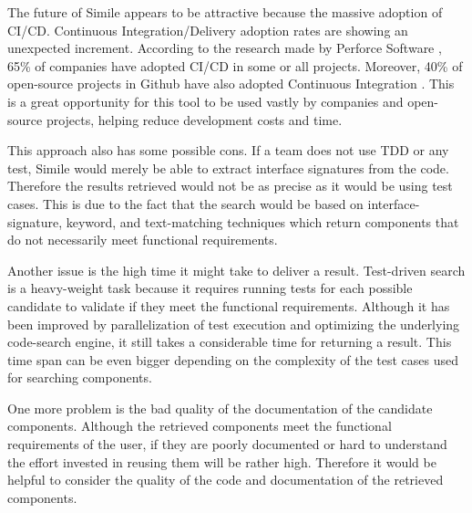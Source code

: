 The future of Simile appears to be attractive because the massive adoption of CI/CD. Continuous Integration/Delivery adoption rates are showing an unexpected increment. According to the research made by Perforce Software \cite{Perforce2015}, 65\% of companies have adopted CI/CD in some or all projects. Moreover, 40\% of open-source projects in Github have also adopted Continuous Integration \cite{Hilton2016}. This is a great opportunity for this tool to be used vastly by companies and open-source projects, helping reduce development costs and time.


This approach also has some possible cons. If a team does not use TDD or any test, Simile would merely be able to extract interface signatures from the code. Therefore the results retrieved would not be as precise as it would be using test cases. This is due to the fact that the search would be based on interface-signature, keyword, and text-matching techniques which return components that do not necessarily meet functional requirements.

Another issue is the high time it might take to deliver a result. Test-driven search is a heavy-weight task because it requires running tests for each possible candidate to validate if they meet the functional requirements. Although it has been improved by parallelization of test execution and optimizing the underlying code-search engine, it still takes a considerable time for returning a result. This time span can be even bigger depending on the complexity of the test cases used for searching components.

One more problem is the bad quality of the documentation of the candidate components. Although the retrieved components meet the functional requirements of the user, if they are poorly documented or hard to understand the effort invested in reusing them will be rather high. Therefore it would be helpful to consider the quality of the code and documentation of the retrieved components.


 